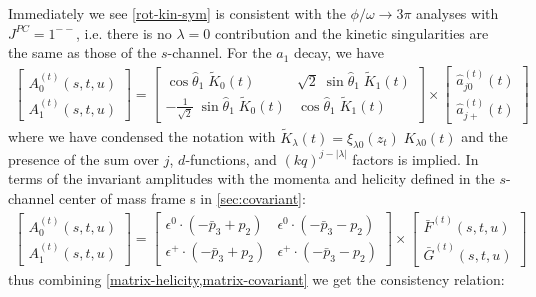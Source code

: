 \documentclass[10pt, aps,prd,amsmath,amssymb,superscriptaddress,onecolumn,
nofootinbib,showpacs,preprintnumbers]{revtex4-1}
\begin{document}
Immediately we see \cref{rot-kin-sym} is consistent with the \(\phi/\omega \to 3\pi\) analyses \cite{Danilkin:2014cra,Niecknig:2012sj} with \(J^{PC} = 1^{--}\), i.e. there is no \(\lambda = 0\) contribution and the kinetic singularities are the same as those of the \(s\)-channel. For the \(a_1\) decay, we have
  \begin{align} \label{matrix-helicity}
    \begin{bmatrix}
  A^{(t)}_0(s,t,u) \\
  A^{(t)}_1(s,t,u)
    \end{bmatrix}
    =
    \begin{bmatrix}
        \cos \hat{\theta}_1 \;  \tilde{K}_{0}(t)   &  \sqrt{2} \; \sin \hat{\theta}_1 \; \tilde{K}_{1}(t) \\
       - \frac{1}{\sqrt{2}}  \; \sin \hat{\theta}_1 \;  \tilde{K}_{0}(t)  & \cos \hat{\theta}_1 \; \tilde{K}_{1}(t)
    \end{bmatrix}
    \times
    \begin{bmatrix}
       \hat{a}^{(t)}_{j0}(t) \\
        \hat{a}^{(t)}_{j+}(t)
    \end{bmatrix}
  \end{align}
where we have condensed the notation with \(\tilde{K}_\lambda(t) = \xi_{\lambda0}(z_t) \; K_{\lambda0}(t)\) and the presence of the sum over \(j\), \(d\)-functions, and \((kq)^{j-|\lambda|}\) factors is implied. In terms of the invariant amplitudes with the momenta and helicity defined in the \(s\)-channel center of mass frame s in \cref{sec:covariant}:
  \begin{align} \label{matrix-covariant}
    \begin{bmatrix}
    A^{(t)}_0(s,t,u) \\
  A^{(t)}_1(s,t,u)
    \end{bmatrix}
    =
    \begin{bmatrix}
      \epsilon^0 \cdot (- \bar{p}_3 + p_2) & \epsilon^0 \cdot (- \bar{p}_3  - p_2) \\
    \epsilon^+ \cdot (- \bar{p}_3 + p_2) & \epsilon^+ \cdot (- \bar{p}_3 - p_2)
    \end{bmatrix}
    \times
    \begin{bmatrix}
      \bar{F}^{(t)}(s,t,u)  \\
      \bar{G}^{(t)}(s,t,u)
    \end{bmatrix}
  \end{align}
thus combining \cref{matrix-helicity,matrix-covariant} we get the consistency relation:
\end{document}
